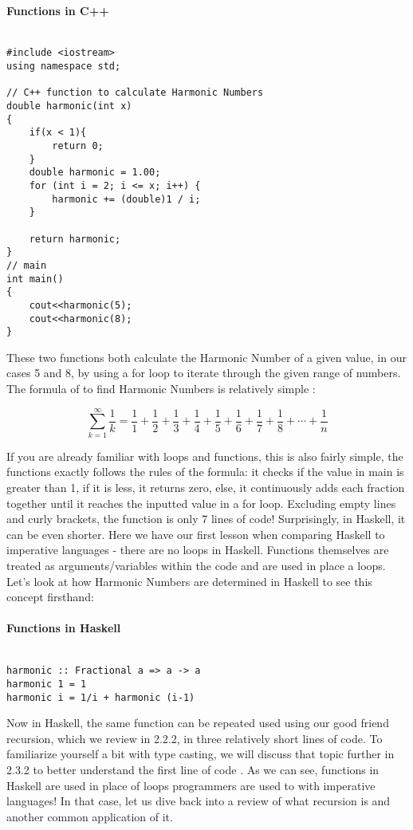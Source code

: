 \documentclass{article}
\begin{document}
\paragraph{Functions in C++}
\begin{lstlisting}

#include <iostream>
using namespace std;
 
// C++ function to calculate Harmonic Numbers
double harmonic(int x)
{
    if(x < 1){
        return 0;
    }
    double harmonic = 1.00;
    for (int i = 2; i <= x; i++) {
        harmonic += (double)1 / i;
    }
 
    return harmonic;
}
// main
int main()
{
    cout<<harmonic(5);
    cout<<harmonic(8);
}
\end{lstlisting}
\noindent
These two functions both calculate the Harmonic Number of a given value, in our cases 5 and 8, by using a for loop to iterate through the given range of numbers. The formula of to find Harmonic Numbers is relatively simple \cite{Harmonic Numbers}:

\[ \sum_{k=1}^{\infty}\frac{1}{k}  = \frac{1}{1} + \frac{1}{2} + \frac{1}{3} + \frac{1}{4} + \frac{1}{5} + \frac{1}{6} + \frac{1}{7} + \frac{1}{8} + \cdots + \frac{1}{n} \]

\noindent
If you are already familiar with loops and functions, this is also fairly simple, the functions exactly follows the rules of the formula: it checks if the value in main is greater than 1, if it is less, it returns zero, else, it continuously adds each fraction together until it reaches the inputted value in a for loop. Excluding empty lines and curly brackets, the function is only 7 lines of code! Surprisingly, in Haskell, it can be even shorter. Here we have our first lesson when comparing Haskell to imperative languages - there are no loops in Haskell. Functions themselves are treated as arguments/variables within the code and are used in place a loops. Let's look at how Harmonic Numbers are determined in Haskell to see this concept firsthand: 

\paragraph{Functions in Haskell}
\begin{lstlisting}

harmonic :: Fractional a => a -> a 
harmonic 1 = 1 
harmonic i = 1/i + harmonic (i-1)
\end{lstlisting}

\noindent
Now in Haskell, the same function can be repeated used using our good friend recursion, which we review in 2.2.2, in three relatively short lines of code. To familiarize yourself a bit with type casting, we will discuss that topic further in 2.3.2 to better understand the first line of code \cite{Haskell.org Fractional}. As we can see, functions in Haskell are used in place of loops programmers are used to with imperative languages! In that case, let us dive back into a review of what recursion is and another common application of it.
\end{document}
